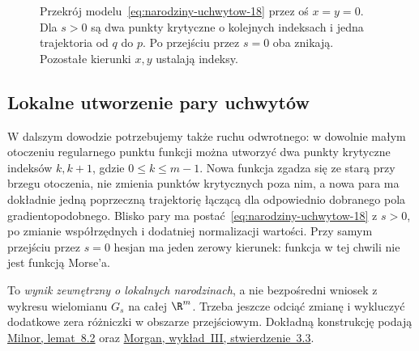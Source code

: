 \begin{figure}[htbp]
\centering
{}
\caption{Przekrój modelu~\eqref{eq:narodziny-uchwytow-18}
przez oś $x=y=0$. Dla $s>0$ są dwa
punkty krytyczne o kolejnych indeksach
i jedna trajektoria od $q$ do $p$.
Po przejściu przez $s=0$ oba znikają.
Pozostałe kierunki $x,y$ ustalają indeksy.}
\label{fig:znoszenie-uchwytow-18}
\end{figure}

\subsection*{Lokalne utworzenie pary uchwytów}
\label{sec:narodziny-lokalne-23}
W dalszym dowodzie potrzebujemy także ruchu odwrotnego:
w dowolnie małym otoczeniu regularnego punktu funkcji
można utworzyć dwa punkty krytyczne indeksów $k,k+1$,
gdzie $0\leq k\leq m-1$. Nowa funkcja zgadza się ze starą
przy brzegu otoczenia, nie zmienia punktów krytycznych poza nim,
a nowa para ma dokładnie jedną poprzeczną trajektorię łączącą
dla odpowiednio dobranego pola gradientopodobnego.
Blisko pary ma postać~\eqref{eq:narodziny-uchwytow-18}
z $s>0$, po zmianie współrzędnych i dodatniej normalizacji wartości.
Przy samym przejściu przez $s=0$ hesjan ma jeden zerowy kierunek:
funkcja w tej chwili nie jest funkcją Morse'a.

To \emph{wynik zewnętrzny o lokalnych narodzinach}, a nie
bezpośredni wniosek z wykresu wielomianu $G_s$ na całej $\R^m$.
Trzeba jeszcze odciąć zmianę i wykluczyć dodatkowe zera
różniczki w obszarze przejściowym. Dokładną konstrukcję podają
\href{https://webhomes.maths.ed.ac.uk/~v1ranick/surgery/hcobord.pdf}
{Milnor, lemat~8.2} oraz
\href{https://www.math.columbia.edu/~jmorgan/Lecture_III_H-cobordism_Theorem.pdf}
{Morgan, wykład~III, stwierdzenie~3.3}.


